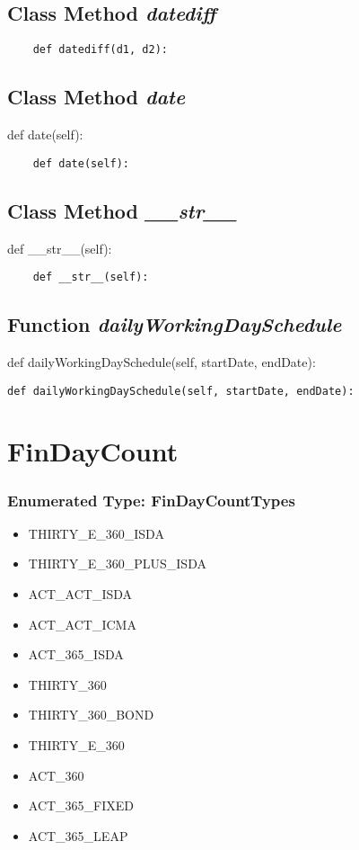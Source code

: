 \documentclass[twoside,11pt]{book}
\begin{document}
\subsection{Class Method {\it datediff}}


\begin{lstlisting}
    def datediff(d1, d2):
\end{lstlisting}

\subsection{Class Method {\it date}}
def date(self):

\begin{lstlisting}
    def date(self):
\end{lstlisting}

\subsection{Class Method {\it \_\_str\_\_}}
def \_\_str\_\_(self):

\begin{lstlisting}
    def __str__(self):
\end{lstlisting}

\subsection{Function {\it dailyWorkingDaySchedule}}
def dailyWorkingDaySchedule(self, startDate, endDate):

\begin{lstlisting}
def dailyWorkingDaySchedule(self, startDate, endDate):
\end{lstlisting}

\newpage
\section{FinDayCount}

\subsubsection{Enumerated Type: FinDayCountTypes}
\begin{itemize}
\item{THIRTY\_E\_360\_ISDA}
\item{THIRTY\_E\_360\_PLUS\_ISDA}
\item{ACT\_ACT\_ISDA}
\item{ACT\_ACT\_ICMA}
\item{ACT\_365\_ISDA}
\item{THIRTY\_360}
\item{THIRTY\_360\_BOND}
\item{THIRTY\_E\_360}
\item{ACT\_360}
\item{ACT\_365\_FIXED}
\item{ACT\_365\_LEAP}
\end{itemize}
\end{document}

